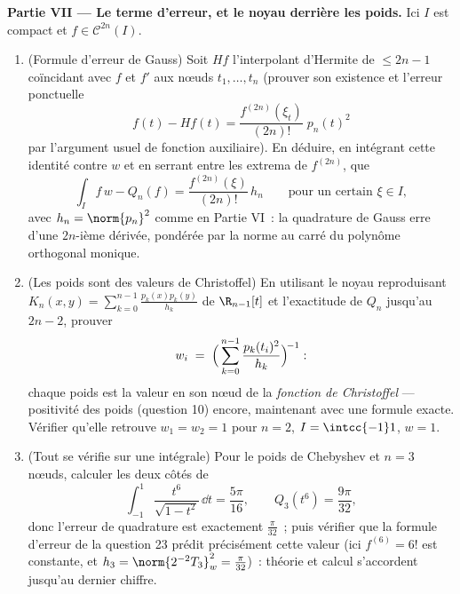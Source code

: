 \begin{problem}
\medskip
\noindent\textbf{Partie VII --- Le terme d'erreur, et le noyau
derrière les poids.} Ici $I$ est compact et $f \in \mathcal
C^{2n}(I)$.
\begin{enumerate}[resume]
  \item (Formule d'erreur de Gauss) Soit $Hf$ l'interpolant
        d'Hermite de  $\leq 2n - 1$ coïncidant avec $f$
        et $f'$ aux nœuds $t_1, \dots, t_n$ (prouver son
        existence et l'erreur ponctuelle
        \[
        f(t) - Hf(t) =
        \frac{f^{(2n)}(\xi_t)}{(2n)!}\;p_n(t)^2
        \]
        par l'argument usuel de fonction auxiliaire). En
        déduire, en intégrant cette identité contre $w$ et en
        serrant entre les extrema de $f^{(2n)}$, que
        \[
        \int_I f\,w - Q_n(f)
        = \frac{f^{(2n)}(\xi)}{(2n)!}\,h_n
        \qquad\text{pour un certain } \xi \in I,
        \]
        avec $h_n = \norm{p_n}^2$ comme en Partie VI~: la
        quadrature de Gauss erre d'une $2n$-ième dérivée,
        pondérée par la norme au carré du polynôme
        orthogonal monique.
  \item (Les poids sont des valeurs de Christoffel) En
        utilisant le noyau reproduisant $K_n(x, y) =
        \sum_{k=0}^{n-1} \frac{p_k(x)p_k(y)}{h_k}$ de
        $\R_{n-1}[t]$ et l'exactitude de $Q_n$ jusqu'au
         $2n - 2$, prouver
        \[
        w_i \;=\;
        \Bigl(\,\sum_{k=0}^{n-1}
        \frac{p_k(t_i)^2}{h_k}\Bigr)^{\!-1} :
        \]
        chaque poids est la valeur en son nœud de la
        \emph{fonction de Christoffel} --- positivité des
        poids (question 10) encore, maintenant avec une
        formule exacte. Vérifier qu'elle retrouve $w_1 = w_2
        = 1$ pour $n = 2$, $I = \intcc{-1}1$, $w = 1$.
  \item (Tout se vérifie sur une intégrale) Pour le poids de
        Chebyshev et $n = 3$ nœuds, calculer les deux côtés de
        \[
        \int_{-1}^{1}\frac{t^6}{\sqrt{1 - t^2}}\,\dd t
        = \frac{5\pi}{16},
        \qquad
        Q_3(t^6) = \frac{9\pi}{32},
        \]
        donc l'erreur de quadrature est exactement
        $\frac{\pi}{32}$~; puis vérifier que la formule
        d'erreur de la question 23 prédit précisément cette
        valeur (ici $f^{(6)} = 6!$ est constante, et $h_3 =
        \norm{2^{-2}T_3}_w^2 = \frac\pi{32}$)~: théorie et
        calcul s'accordent jusqu'au dernier chiffre.
\end{enumerate}

\end{problem}
